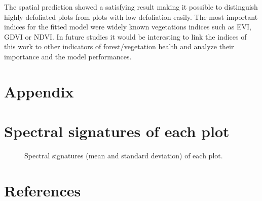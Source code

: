 \documentclass[review]{elsarticle}
\begin{document}
The spatial prediction showed a satisfying result making it possible to distinguish highly defoliated plots from plots with low defoliation easily.
The most important indices for the fitted model were widely known vegetations indices such as EVI, GDVI or NDVI.
In future studies it would be interesting to link the indices of this work to other indicators of forest/vegetation health and analyze their importance and the model performances.

\section{Appendix}

\appendix
\gdef\thesection{\Alph{section}} %
\makeatletter
\renewcommand\@seccntformat[1]{Appendix \csname the#1\endcsname.\hspace{0.5em}}
\makeatother

\section{Spectral signatures of each plot}

\begin{figure} [H]
	\begin{center}
		\caption{Spectral signatures (mean and standard deviation) of each plot.}
		\label{fig:spectral_signatures}
	\end{center}
\end{figure}

\pagebreak

\section*{References}


\end{document}
